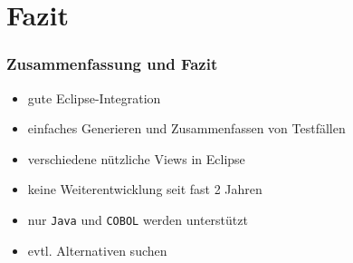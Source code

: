 \documentclass{beamer}
\begin{document}
  \section{Fazit}
  \begin{frame}\frametitle{Zusammenfassung und Fazit}
    \begin{itemize}[<+->]
      \item gute Eclipse-Integration
      \item einfaches Generieren und Zusammenfassen von Testfällen
      \item verschiedene nützliche Views in Eclipse
      \item keine Weiterentwicklung seit fast 2 Jahren
      \item nur \texttt{Java} und \texttt{COBOL} werden unterstützt
      \item evtl. Alternativen suchen
    \end{itemize}
  \end{frame}
\end{document}

